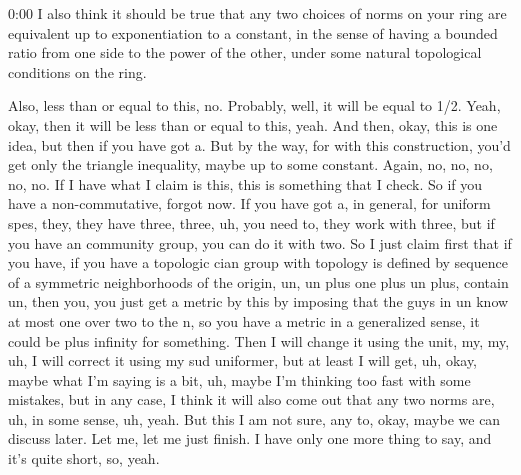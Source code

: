 \begin{unfinished}{0:00}
I also think it should be true that any two choices of norms on your ring are equivalent up to exponentiation to a constant, in the sense of having a bounded ratio from one side to the power of the other, under some natural topological conditions on the ring.

Also, less than or equal to this, no. Probably, well, it will be equal to 1/2. Yeah, okay, then it will be less than or equal to this, yeah. And then, okay, this is one idea, but then if you have got a. But by the way, for with this construction, you'd get only the triangle inequality, maybe up to some constant. Again, no, no, no, no, no. If I have what I claim is this, this is something that I check. So if you have a non-commutative, forgot now. If you have got a, in general, for uniform spes, they, they have three, three, uh, you need to, they work with three, but if you have an community group, you can do it with two. So I just claim first that if you have, if you have a topologic cian group with topology is defined by sequence of a symmetric neighborhoods of the origin, un, un plus one plus un plus, contain un, then you, you just get a metric by this by imposing that the guys in un know at most one over two to the n, so you have a metric in a generalized sense, it could be plus infinity for something. Then I will change it using the unit, my, my, uh, I will correct it using my sud uniformer, but at least I will get, uh, okay, maybe what I'm saying is a bit, uh, maybe I'm thinking too fast with some mistakes, but in any case, I think it will also come out that any two norms are, uh, in some sense, uh, yeah. But this I am not sure, any to, okay, maybe we can discuss later. Let me, let me just finish. I have only one more thing to say, and it's quite short, so, yeah.


\end{unfinished}
